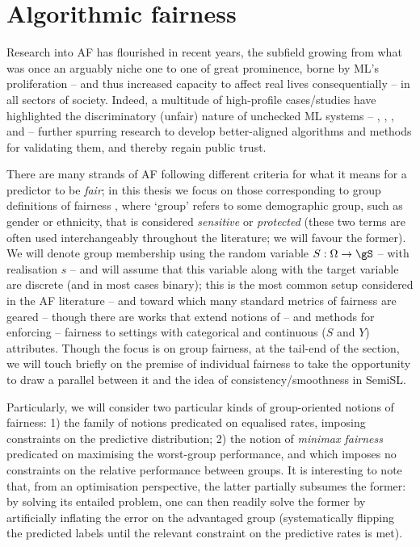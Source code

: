 \section{Algorithmic fairness}\label{sec:fairml}
Research into \acf{AF} has flourished in recent years, the subfield growing from what was once an
arguably niche one to one of great prominence, borne by \ac{ML}'s proliferation -- and thus
increased capacity to affect real lives consequentially -- in all sectors of society.
%
Indeed, a multitude of high-profile cases/studies have highlighted the discriminatory (unfair)
nature of unchecked \ac{ML} systems -- \cite{kasperkevic2015google}, \cite{angwin2016machine},
\cite{dastin2018amazon}, and \cite{buolamwini2018gender} -- further spurring research to develop
better-aligned algorithms and methods for validating them, and thereby regain public trust.

%
There are many strands of \ac{AF} following different criteria for what it means for a
predictor to be \emph{fair}; in this thesis we focus on those corresponding to group definitions of
fairness \citep{barocas2019fairness}, where `group' refers to some demographic group, such as
gender or ethnicity, that is considered \emph{sensitive} or \emph{protected} (these two terms are
often used interchangeably throughout the literature; we will favour the former).
%
We will denote group membership using the random variable \( S: \Omega \to \gS \) -- with
realisation \(s\) -- and will assume that this variable along with the target variable are discrete
(and in most cases binary); this is the most common setup considered in the \ac{AF} literature --
and toward which many standard metrics of fairness are geared \citep{feldman2015certifying,
hardt2016equality, woodworth2017learning} -- though there are works that extend notions of -- and
methods for enforcing -- fairness to settings with categorical and continuous (\( S \) and \( Y \))
attributes.
%
Though the focus is on group fairness, at the tail-end of the section, we will touch briefly on the
premise of individual fairness \citep{dwork2012fairness} to take the opportunity to draw a parallel
between it and the idea of consistency/smoothness in SemiSL.

%
Particularly, we will consider two particular kinds of group-oriented notions of fairness: 1) the
family of notions predicated on equalised rates, imposing constraints on the predictive
distribution; 2) the notion of \emph{minimax fairness} predicated on maximising the worst-group
performance, and which imposes no constraints on the relative performance between groups.
%
It is interesting to note that, from an optimisation perspective, the latter partially subsumes the
former: by solving its entailed problem, one can then readily solve the former by artificially
inflating the error on the advantaged group (systematically flipping the predicted labels until the
relevant constraint on the predictive rates is met).


